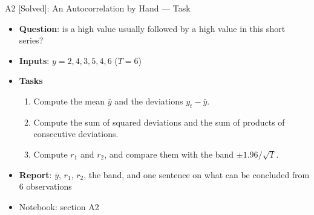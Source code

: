 \begin{frame}{A2 [Solved]: An Autocorrelation by Hand --- Task}
\itemsize{\small}
\begin{itemize}
\item \textbf{Question}: is a high value usually followed by a high value in this short series?
\item \textbf{Inputs}: $y = 2, 4, 3, 5, 4, 6$ ($T = 6$)
\item \textbf{Tasks}
\begin{enumerate}
    \item Compute the mean $\bar y$ and the deviations $y_t - \bar y$.
    \item Compute the sum of squared deviations and the sum of products of consecutive deviations.
    \item Compute $r_1$ and $r_2$, and compare them with the band $\pm 1.96/\sqrt T$.
\end{enumerate}
\item \textbf{Report}: $\bar y$, $r_1$, $r_2$, the band, and one sentence on what can be concluded from 6 observations
\item Notebook: section A2
\end{itemize}
\end{frame}

